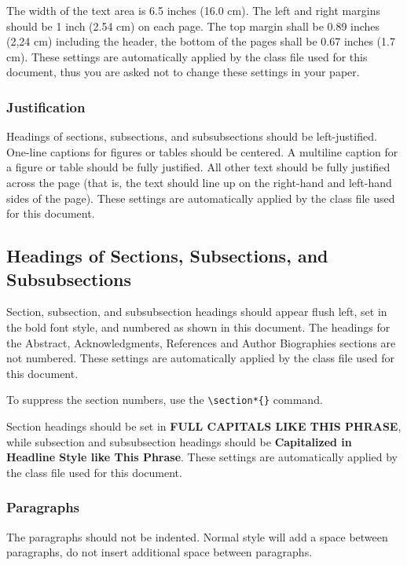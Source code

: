 \documentclass{scspaperproc}
\theoremstyle{scsthe}
\begin{document}
The width of the text area is 6.5 inches (16.0 cm). The left and right margins should be 1 inch (2.54 cm) on each page. The top margin shall be 0.89 inches (2,24 cm) including the header, the bottom of the pages shall be 0.67 inches (1.7 cm). These settings are automatically applied by the class file used for this document, thus you are asked not to change these settings in your paper.

\subsubsection{Justification}
Headings of sections, subsections, and subsubsections should be left-justified. One-line captions for figures or tables should be centered. A multiline caption for a figure or table should be fully justified. All other text should be fully justified across the page (that is, the text should line up on the right-hand and left-hand sides of the page). These settings are automatically applied by the class file used for this document.

\subsection{Headings of Sections, Subsections, and Subsubsections}
Section, subsection, and subsubsection headings should appear flush left, set in the bold font style, and numbered as shown in this document. The headings for the Abstract, Acknowledgments, References and Author Biographies sections are not numbered. These settings are automatically applied by the class file used for this document.

To suppress the section numbers, use the \verb+\section*{}+ command.

Section headings should be set in \textbf{\uppercase{full capitals like this phrase}}, while subsection and subsubsection headings should be \textbf{Capitalized
in Headline Style like This Phrase}. These settings are automatically applied by the class file used for this document.

\subsubsection{Paragraphs}
The paragraphs should not be indented. Normal style will add a space between paragraphs, do not insert additional space between paragraphs.
\end{document}

